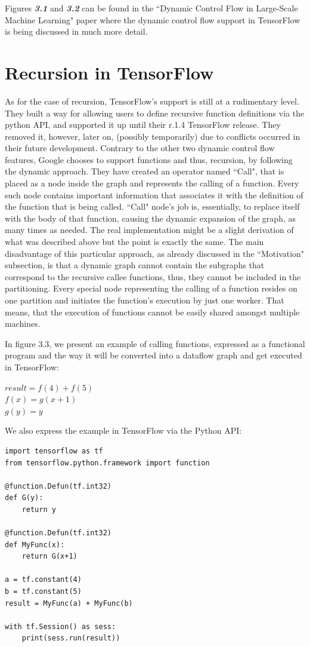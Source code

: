 \documentclass[ack,preface]{dithesis}
\begin{document}
Figures \textit{\textbf{3.1}} and \textit{\textbf{3.2}}  can be found in the ``Dynamic Control Flow in Large-Scale Machine Learning" paper  \cite{Yu:2018} where the dynamic control flow support in TensorFlow is being discussed in much more detail. 

\section{Recursion in TensorFlow}
As for the case of recursion, TensorFlow's support is still at a rudimentary level. They built a way for allowing users to define recursive function definitions via the python API,  and supported it up until their r.1.4 TensorFlow release. They removed it, however, later on, (possibly temporarily) due to conflicts occurred in their future development. Contrary to the other two dynamic control flow features, Google chooses to support functions and thus, recursion, by following the dynamic approach.  They have created an operator named ``Call", that is placed as a node inside the graph and represents the calling of a function. Every such node contains important information that associates it with the definition  of the function that is being called.  ``Call" node's job is, essentially,  to replace itself with the body of that function, causing the dynamic expansion of the graph, as many times as needed. The real implementation might be a slight derivation of what was described above but the point is exactly the same.
The main disadvantage of this particular approach, as already discussed in the ``Motivation" subsection, is that a dynamic graph  cannot contain the subgraphs that correspond to the recursive callee functions, thus, they cannot be included in the partitioning. Every special node representing the calling of a function resides on one partition and initiates the function's execution by just one worker. That means, that the execution of functions cannot be easily shared amongst multiple machines.

\begin{flushleft}
  In figure 3.3, we present an example of calling functions, expressed as a functional program and the way it will be converted into a dataflow graph and get executed in TensorFlow:

 \setlength{\parindent}{25ex} $result = f(4) + f(5)$ \\
$f(x) = g(x+1)$ \\ 
$g(y) = y$
\end{flushleft}

We also express the example in TensorFlow via the Python API:
\begin{lstlisting}
import tensorflow as tf
from tensorflow.python.framework import function

@function.Defun(tf.int32)
def G(y):
	return y

@function.Defun(tf.int32)
def MyFunc(x):
	return G(x+1)

a = tf.constant(4)
b = tf.constant(5)
result = MyFunc(a) + MyFunc(b)

with tf.Session() as sess:
	print(sess.run(result))
\end{lstlisting}
\end{document}
